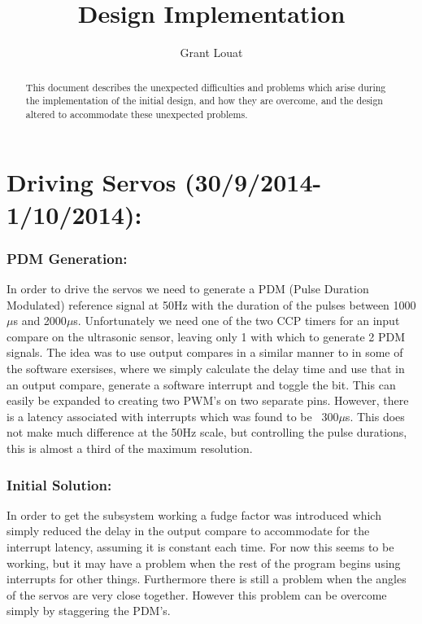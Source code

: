 \documentclass[]{article}
\title{Design Implementation}
\author{Grant Louat}
\begin{document}
\maketitle

\newpage
\begin{abstract}
This document describes the unexpected difficulties and problems which arise during the implementation of the initial design, and how they are overcome, and the design altered to accommodate these unexpected problems.
\end{abstract}

\newpage
\section{Driving Servos (30/9/2014- 1/10/2014):}
\subsubsection{PDM Generation:}
In order to drive the servos we need to generate a PDM (Pulse Duration Modulated) reference signal at 50Hz with the duration of the pulses between 1000$\mu$s and 2000$\mu$s. Unfortunately we need one of the two CCP timers for an input compare on the ultrasonic sensor, leaving only 1 with which to generate 2 PDM signals. \newline
The idea was to use output compares in a similar manner to in some of the software exersises, where we simply calculate the delay time and use that in an output compare, generate a software interrupt and toggle the bit. This can easily be expanded to creating two PWM's on two separate pins. However, there is a latency associated with interrupts which was found to be ~300$\mu$s. This does not make much difference at the 50Hz scale, but controlling the pulse durations, this is almost a third of the maximum resolution.

\subsubsection{Initial Solution:}
In order to get the subsystem working a fudge factor was introduced which simply reduced the delay in the output compare to accommodate for the interrupt latency, assuming it is constant each time. For now this seems to be working, but it may have a problem when the rest of the program begins using interrupts for other things. Furthermore there is still a problem when the angles of the servos are very close together. However this problem can be overcome simply by staggering the PDM's.
\end{document}
